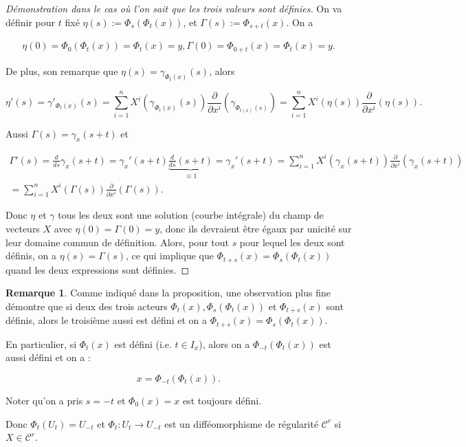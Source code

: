 \documentclass[french]{article}
\theoremstyle{definition}
\newtheorem{protoremark}{Remarque}[section]
\newenvironment{remark}
    {\colorlet{shadecolor}{yellow!5}\begin{shaded}\begin{protoremark}}
    {\end{protoremark}\end{shaded}}
\begin{document}
\begin{proof}[Démonstration dans le cas où l'on sait que les trois valeurs sont définies]
  On va définir pour \(t\) fixé \(\eta(s) := \Phi_s(\Phi_t(x))\), et \(\Gamma(s) := \Phi _{s+t}(x)\). On a

  \begin{gather*}
    \eta(0) = \Phi_0(\Phi_t(x)) = \Phi_t(x)=y,
    \Gamma(0) = \Phi _{0+t}(x)= \Phi _{t}(x)=y.
  \end{gather*}

  De plus, son remarque que  \(\eta(s) = \gamma _{\Phi_t(x)}(s)\), alors

  \[\eta'(s) = \gamma' _{\Phi_t(x)}(s) = \sum_{i=1}^{n} X ^{i}(\gamma _{\Phi_t(x)}(s)) \frac{\partial  }{\partial x ^{i}}(\gamma _{\Phi _{t(x)}(s)})  =\sum_{i=1}^{n} X ^{i}(\eta(s)) \frac{\partial  }{\partial x ^{i}}(\eta(s)).\]

  Aussi \(\Gamma(s) = \gamma_x(s+t)\) et

  \begin{gather*}
    \Gamma'(s) = \frac{d}{ds}\gamma_x(s+t) = \gamma_x'(s+t) \underbrace{\frac{d}{ds}(s+t)}_{\equiv 1} = \gamma_x'(s+t) = \sum_{i=1}^{n} X ^{i}(\gamma_x(s+t)) \frac{\partial  }{\partial x ^{i}}(\gamma_x(s+t))\\
    = \sum_{i=1}^{n} X ^{i}(\Gamma(s)) \frac{\partial  }{\partial x ^{i}}(\Gamma(s)).
  \end{gather*}

  Donc \(\eta\) et \(\gamma\) tous les deux sont une solution (courbe intégrale) du champ de vecteurs \(X\) avec \(\eta(0) = \Gamma(0)=y\), donc ils devraient être égaux par unicité sur leur domaine commun de d\'efinition. Alors, pour tout \(s\) pour lequel les deux sont d\'efinis, on a \(\eta(s) = \Gamma(s)\), ce qui implique que \(\Phi _{t+s}(x) = \Phi_s(\Phi_t(x))\) quand les deux expressions sont d\'efinies.
\end{proof}

\begin{remark}
  Comme indiqu\'e dans la proposition, une observation plus fine démontre que si deux des trois acteurs \(\Phi_t(x), \Phi_s(\Phi_t(x)) \text{ et } \Phi _{t+s}(x)\) sont définis, alors le troisième aussi est défini et on a \(\Phi _{t+s}(x) = \Phi_s(\Phi_t(x))\).

  En particulier, si \(\Phi_t(x)\) est défini (i.e. \(t \in I_x\)), alors on a \(\Phi _{-t}(\Phi _{t}(x))\) est aussi défini et on a :

  \[x = \Phi _{-t}(\Phi _{t}(x)).\]

  Noter qu'on a pris \(s = -t\) et \(\Phi_0(x) = x\) est toujours défini.

  Donc \(\Phi_t(U_t) = U _{-t}\) et \(\Phi_t : U_t \longrightarrow U _{-t}\) est un difféomorphisme de régularité \(\mathcal{C}^r\) si \(X \in \mathcal{C}^r\).
\end{remark}
\end{document}
